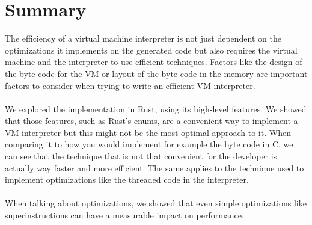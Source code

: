 \documentclass{article}
\begin{document}
\section{Summary}
The efficiency of a virtual machine interpreter is not just dependent on the
optimizations it implements on the generated code but also requires the virtual
machine and the interpreter to use efficient techniques. Factors like the
design of the byte code for the VM or layout of the byte code in the memory are
important factors to consider when trying to write an efficient VM interpreter.
\\\\
We explored the implementation in Rust, using its high-level features. We
showed that those features, such as Rust's enums, are a convenient way to
implement a VM interpreter but this might not be the most optimal approach to it.
When comparing it to how you would implement for example the byte code in C, we
can see that the technique that is not that convenient for the developer is
actually way faster and more efficient.
The same applies to the technique used to implement optimizations like the
threaded code in the interpreter.
\\\\
When talking about optimizations, we showed that even simple optimizations
like superinstructions can have a measurable impact on performance. 
\end{document}
